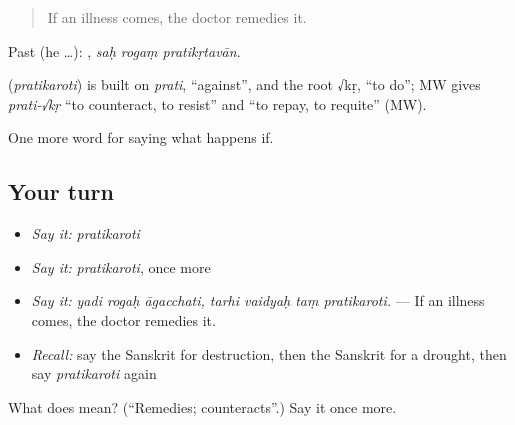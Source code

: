 \begin{quote}
If an illness comes, the doctor remedies it.
\end{quote}

Past (he …):   , \emph{saḥ rogaṃ pratikṛtavān}.

\begin{cousinweb}
\textbf{} (\emph{pratikaroti}) is built on \emph{prati}, \textquotedblleft{}against\textquotedblright{}, and the root √kṛ, \textquotedblleft{}to do\textquotedblright{}; MW gives \emph{prati-√kṛ} \textquotedblleft{}to counteract, to resist\textquotedblright{} and \textquotedblleft{}to repay, to requite\textquotedblright{} (MW).
\end{cousinweb}

\begin{grammarlens}[title={What you've built}]
One more word for saying what happens if.
\end{grammarlens}

\subsection*{Your turn}
\begin{itemize}
\raggedright
  \item \emph{Say it:} \emph{pratikaroti}
  \item \emph{Say it:} \emph{pratikaroti}, once more
  \item \emph{Say it:} \emph{yadi rogaḥ āgacchati, tarhi vaidyaḥ taṃ pratikaroti.} — If an illness comes, the doctor remedies it.
  \item \emph{Recall:} say the Sanskrit for destruction, then the Sanskrit for a drought, then say \emph{pratikaroti} again
\end{itemize}

\begin{tcolorbox}[breakable,colback=teal!4,colframe=teal!35!black,title={Before you move on}]
What does  mean? (\textquotedblleft{}Remedies; counteracts\textquotedblright{}.) Say it once more.
\end{tcolorbox}
